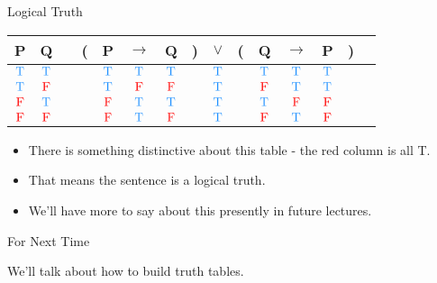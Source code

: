 \documentclass[
  ignorenonframetext,
]{beamer}
\providecommand{\tightlist}{%
  \setlength{\itemsep}{0pt}\setlength{\parskip}{0pt}}
\renewcommand{\,}{\text{, }}
\def\True{\textcolor{dodgerblue}{\text{T}}}
\def\False{\textcolor{red}{\text{F}}}
\begin{document}
\begin{frame}{Logical Truth}
\protect\hypertarget{logical-truth}{}

\begin{center}
\begin{tabular}{@{ }c@{ }@{ }c | c@{ }@{}c@{}@{ }c@{ }@{ }c@{ }@{ }c@{ }@{}c@{}@{ }c@{ }@{}c@{}@{ }c@{ }@{ }c@{ }@{ }c@{ }@{}c@{}@{ }c}
P & Q &  & ( & P & $\rightarrow$ & Q & ) & $\lor$ & ( & Q & $\rightarrow$ & P & ) & \\
\hline 
$\True$ & $\True$ &  &  & $\True$ & $\True$ & $\True$ &  & \textcolor{red}{$\True$} &  & $\True$ & $\True$ & $\True$ &  & \\
$\True$ & $\False$ &  &  & $\True$ & $\False$ & $\False$ &  & \textcolor{red}{$\True$} &  & $\False$ & $\True$ & $\True$ &  & \\
$\False$ & $\True$ &  &  & $\False$ & $\True$ & $\True$ &  & \textcolor{red}{$\True$} &  & $\True$ & $\False$ & $\False$ &  & \\
$\False$ & $\False$ &  &  & $\False$ & $\True$ & $\False$ &  & \textcolor{red}{$\True$} &  & $\False$ & $\True$ & $\False$ &  & \\
\end{tabular}
\bigskip
\end{center}

\begin{itemize}
\tightlist
\item
  There is something distinctive about this table - the red column is
  all T.
\item
  That means the sentence is a logical truth.
\item
  We'll have more to say about this presently in future lectures.
\end{itemize}

\end{frame}

\begin{frame}{For Next Time}
\protect\hypertarget{for-next-time}{}

We'll talk about how to build truth tables.

\end{frame}
\end{document}
